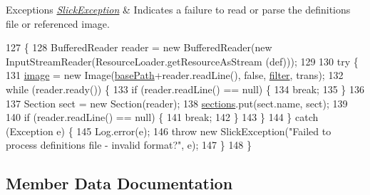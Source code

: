 \begin{DoxyExceptions}{Exceptions}
{\em \mbox{\hyperlink{classorg_1_1newdawn_1_1slick_1_1_slick_exception}{Slick\+Exception}}} & Indicates a failure to read or parse the definitions file or referenced image. \\
\hline
\end{DoxyExceptions}

\begin{DoxyCode}
127                                                                                \{
128         BufferedReader reader = \textcolor{keyword}{new} BufferedReader(\textcolor{keyword}{new} InputStreamReader(ResourceLoader.getResourceAsStream
      (def)));
129     
130         \textcolor{keywordflow}{try} \{
131             \mbox{\hyperlink{classorg_1_1newdawn_1_1slick_1_1_packed_sprite_sheet_a3bfe1d01086f84a9f9bdacbfb2f5ceba}{image}} = \textcolor{keyword}{new} Image(\mbox{\hyperlink{classorg_1_1newdawn_1_1slick_1_1_packed_sprite_sheet_a5343b639d543ab4780adabb0f8ac15cd}{basePath}}+reader.readLine(), \textcolor{keyword}{false}, 
      \mbox{\hyperlink{classorg_1_1newdawn_1_1slick_1_1_packed_sprite_sheet_a03daeb71e62c853200c961868ce8468a}{filter}}, trans);
132             \textcolor{keywordflow}{while} (reader.ready()) \{
133                 \textcolor{keywordflow}{if} (reader.readLine() == null) \{
134                     \textcolor{keywordflow}{break};
135                 \}
136                 
137                 Section sect = \textcolor{keyword}{new} Section(reader);
138                 \mbox{\hyperlink{classorg_1_1newdawn_1_1slick_1_1_packed_sprite_sheet_a7585e251934ce67d5c2a69448e461f29}{sections}}.put(sect.name, sect);
139                 
140                 \textcolor{keywordflow}{if} (reader.readLine() == null) \{
141                     \textcolor{keywordflow}{break};
142                 \}
143             \}
144         \} \textcolor{keywordflow}{catch} (Exception e) \{
145             Log.error(e);
146             \textcolor{keywordflow}{throw} \textcolor{keyword}{new} SlickException(\textcolor{stringliteral}{"Failed to process definitions file - invalid format?"}, e);
147         \}
148     \}
\end{DoxyCode}


\subsection{Member Data Documentation}
\mbox{\label{classorg_1_1newdawn_1_1slick_1_1_packed_sprite_sheet_a5343b639d543ab4780adabb0f8ac15cd}} 

